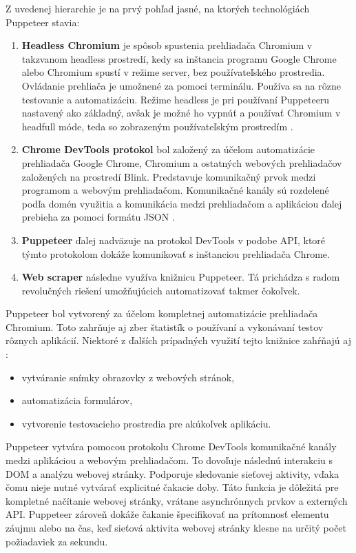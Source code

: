 \bigskip

Z uvedenej hierarchie je na prvý pohľad jasné, na ktorých technológiách Puppeteer stavia:

\begin{enumerate}
  \item \textbf{Headless Chromium} je spôsob spustenia prehliadača Chromium v takzvanom headless prostredí, kedy sa inštancia programu Google Chrome alebo Chromium spustí v režime server, bez používateľského prostredia. Ovládanie prehliača je umožnené za pomoci terminálu. Používa sa na rôzne testovanie a automatizáciu. Režime headless je pri používaní Puppeteeru nastavený ako základný, avšak je možné ho vypnúť a používať Chromium v headfull móde, teda so zobrazeným používateľským prostredím \cite{chromium}.
  \item \textbf{Chrome DevTools protokol} bol založený za účelom automatizácie prehliadača Google Chrome, Chromium a ostatných webových prehliadačov založených na prostredí Blink. Predstavuje komunikačný prvok medzi programom a webovým prehliadačom. Komunikačné kanály sú rozdelené podľa domén využitia a komunikácia medzi prehliadačom a aplikáciou ďalej prebieha za pomoci formátu JSON \cite{devtools}.
  \item \textbf{Puppeteer} ďalej nadväzuje na protokol DevTools v podobe API, ktoré týmto protokolom dokáže komunikovať s inštanciou prehliadača Chrome.
  \item \textbf{Web scraper} následne využíva knižnicu Puppeteer. Tá prichádza s radom revolučných riešení umožňujúcich automatizovať takmer čokoľvek.
\end{enumerate}

\newpage

Puppeteer bol vytvorený za účelom kompletnej automatizácie prehliadača Chromium. Toto zahrňuje aj zber štatistík o používaní a vykonávaní testov rôznych aplikácií. Niektoré z ďalších prípadných využití tejto knižnice zahŕňajú aj \cite{puppeteer}:
\begin{itemize}
    \item vytváranie snímky obrazovky z webových stránok,
    \item automatizácia formulárov,
    \item vytvorenie testovacieho prostredia pre akúkoľvek aplikáciu.
\end{itemize}

\bigskip

Puppeteer vytvára pomocou protokolu Chrome DevTools komunikačné kanály medzi aplikáciou a webovým prehliadačom. To dovoľuje následnú interakciu s DOM a analýzu webovej stránky. Podporuje sledovanie sieťovej aktivity, vďaka čomu nieje nutné vytvárať explicitné čakacie doby. Táto funkcia je dôležitá pre kompletné načítanie webovej stránky, vrátane asynchrónnych prvkov a externých API. Puppeteer zároveň dokáže čakanie špecifikovať na prítomnosť elementu záujmu alebo na čas, keď sieťová aktivita webovej stránky klesne na určitý počet požiadaviek za sekundu.

